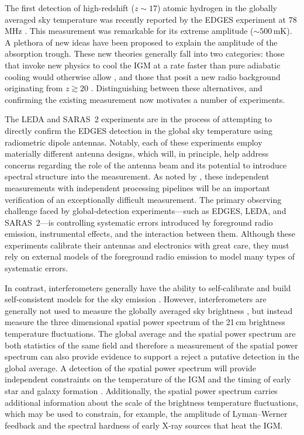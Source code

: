 \documentclass[twocolumn]{aastex62}
\begin{document}
The first detection of high-redshift ($z\sim 17$) atomic hydrogen in the globally averaged sky
temperature was recently reported by the EDGES experiment at 78\,MHz \citep{2018Natur.555...67B}.
This measurement was remarkable for its extreme amplitude ($\sim 500\,\text{mK}$).  A plethora of
new ideas have been proposed to explain the amplitude of the absorption trough. These new theories
generally fall into two categories: those that invoke new physics to cool the IGM at a rate faster
than pure adiabatic cooling would otherwise allow \citep[e.g.,][]{2018Natur.555...71B,
2018PhRvL.121a1101F}, and those that posit a new radio background originating from $z\gtrsim 20$
\citep[e.g.][]{2018arXiv180301815E, 2018ApJ...858L...9D}. Distinguishing between these alternatives,
and confirming the existing measurement now motivates a number of experiments.

The LEDA \citep{2018MNRAS.478.4193P} and SARAS~2 \citep{2018ApJ...858...54S} experiments are in the
process of attempting to directly confirm the EDGES detection in the global sky temperature using
radiometric dipole antennas.  Notably, each of these experiments employ materially different antenna
designs, which will, in principle, help address concerns regarding the role of the antenna beam and
its potential to introduce spectral structure into the measurement. As noted by
\citet{2018Natur.555...67B}, these independent measurements with independent processing pipelines
will be an important verification of an exceptionally difficult measurement.  The primary observing
challenge faced by global-detection experiments---such as EDGES, LEDA, and SARAS~2---is controlling
systematic errors introduced by foreground radio emission, instrumental effects, and the interaction
between them. Although these experiments calibrate their antennas and electronics with great care,
they must rely on external models of the foreground radio emission to model many types of systematic
errors.

In contrast, interferometers generally have the ability to self-calibrate and build self-consistent
models for the sky emission \citep[e.g.,][]{2018AJ....156...32E}. However, interferometers are
generally not used to measure the globally averaged sky brightness \citep{2016ApJ...826..116V}, but
instead measure the three dimensional spatial power spectrum of the 21\,cm brightness temperature
fluctuations. The global average and the spatial power spectrum are both statistics of the same
field and therefore a measurement of the spatial power spectrum can also provide evidence to support
a reject a putative detection in the global average.  A detection of the spatial power spectrum will
provide independent constraints on the temperature of the IGM and the timing of early star and
galaxy formation \citep[e.g.,][]{2017MNRAS.472.2651G}.  Additionally, the spatial power spectrum
carries additional information about the scale of the brightness temperature fluctuations, which may
be used to constrain, for example, the amplitude of Lyman--Werner feedback
\citep{2013MNRAS.432.2909F} and the spectral hardness of early X-ray sources
\citep{2014MNRAS.437L..36F} that heat the IGM.
\end{document}
